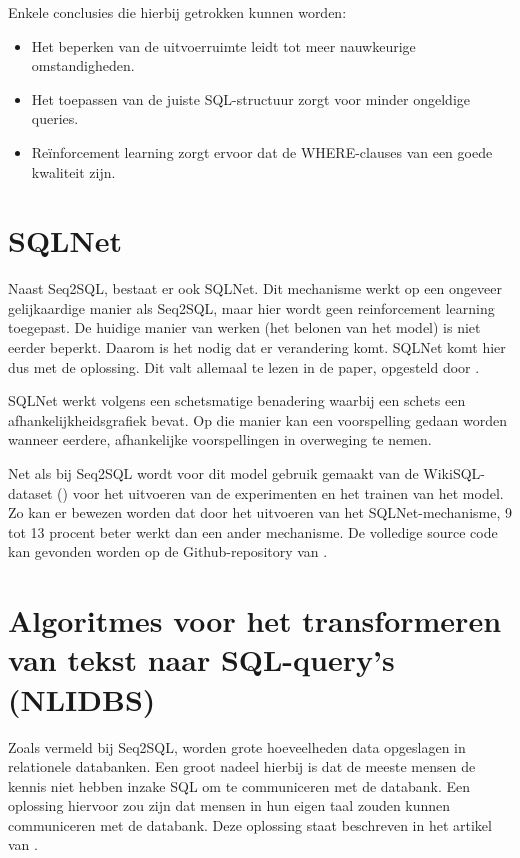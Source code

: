 Enkele conclusies die hierbij getrokken kunnen worden:
\begin{itemize}
	\item Het beperken van de uitvoerruimte leidt tot meer nauwkeurige omstandigheden.
	\item Het toepassen van de juiste SQL-structuur zorgt voor minder ongeldige queries.
	\item Reïnforcement learning zorgt ervoor dat de WHERE-clauses van een goede kwaliteit zijn.
\end{itemize}

\section{SQLNet}

Naast Seq2SQL, bestaat er ook SQLNet. Dit mechanisme werkt op een ongeveer gelijkaardige manier als Seq2SQL, maar hier wordt geen reinforcement learning toegepast. De huidige manier van werken (het belonen van het model) is niet eerder beperkt. Daarom is het nodig dat er verandering komt. SQLNet komt hier dus met de oplossing. Dit valt allemaal te lezen in de paper, opgesteld door \textcite{sqlnetPaper}.

SQLNet werkt volgens een schetsmatige benadering waarbij een schets een afhankelijkheidsgrafiek bevat. Op die manier kan een voorspelling gedaan worden wanneer eerdere, afhankelijke voorspellingen in overweging te nemen. 

Net als bij Seq2SQL wordt voor dit model gebruik gemaakt van de WikiSQL-dataset (\textcite{wikisql}) voor het uitvoeren van de experimenten en het trainen van het model. Zo kan er bewezen worden dat door het uitvoeren van het SQLNet-mechanisme, 9 tot 13 procent beter werkt dan een ander mechanisme. De volledige source code kan gevonden worden op de Github-repository van \textcite{sqlnet}.

\section{Algoritmes voor het transformeren van tekst naar SQL-query's (NLIDBS)}

Zoals vermeld bij Seq2SQL, worden grote hoeveelheden data opgeslagen in relationele databanken. Een groot nadeel hierbij is dat de meeste mensen de kennis niet hebben inzake SQL om te communiceren met de databank. Een oplossing hiervoor zou zijn dat mensen in hun eigen taal zouden kunnen communiceren met de databank. Deze oplossing staat beschreven in het artikel van \textcite{nlidbs}.


